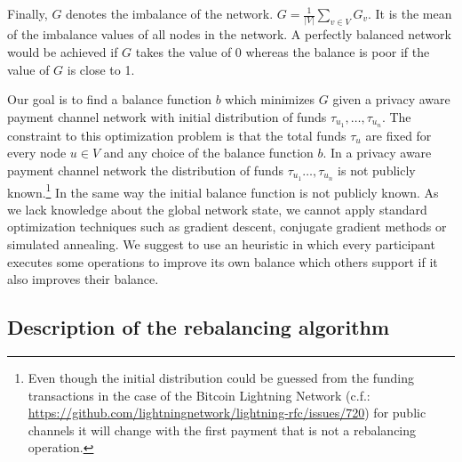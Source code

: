 \documentclass[conference]{IEEEtran}
\begin{document}
Finally, $G$ denotes the imbalance of the network. $G = \displaystyle{\frac{1}{|V|}\sum_{v\in V}G_v}$. It is the mean of the imbalance values of all nodes in the network.
A perfectly balanced network would be achieved if $G$ takes the value of $0$ whereas the balance is poor if the value of $G$ is close to 1.

Our goal is to find a balance function $b$ which minimizes $G$ given a privacy aware payment channel network with initial distribution of funds $\tau_{u_1},\dots,\tau_{u_n}$.
The constraint to this optimization problem is that the total funds $\tau_u$ are fixed for every node $u \in V$ and any choice of the balance function $b$.
In a privacy aware payment channel network the distribution of funds $\tau_{u_1}\dots,\tau_{u_n}$ is not publicly known.\footnote{Even though the initial distribution could be guessed from the funding transactions in the case of the Bitcoin Lightning Network (c.f.: \url{https://github.com/lightningnetwork/lightning-rfc/issues/720}) for public channels it will change with the first payment that is not a rebalancing operation.}
In the same way the initial balance function is not publicly known.
As we lack knowledge about the global network state, we cannot apply standard optimization techniques such as gradient descent, conjugate gradient methods or simulated annealing.
We suggest to use an heuristic in which every participant executes some operations to improve its own balance which others support if it also improves their balance.


\subsection{Description of the rebalancing algorithm}
\label{sec:Algorithm}
\end{document}

